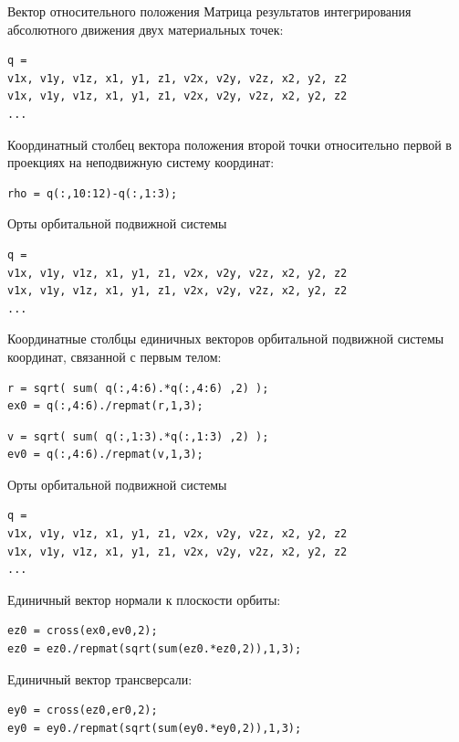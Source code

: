 \documentclass[12pt, compress]{beamer}
\begin{document}
\begin{frame}[fragile]{Вектор относительного положения}
Матрица результатов интегрирования абсолютного движения двух материальных точек:
\begin{lstlisting}
q = 
v1x, v1y, v1z, x1, y1, z1, v2x, v2y, v2z, x2, y2, z2
v1x, v1y, v1z, x1, y1, z1, v2x, v2y, v2z, x2, y2, z2
...
\end{lstlisting}
Координатный столбец вектора положения второй точки относительно первой в проекциях на неподвижную систему координат:
\begin{lstlisting}
rho = q(:,10:12)-q(:,1:3);
\end{lstlisting}
\end{frame}

\begin{frame}[fragile]{Орты орбитальной подвижной системы}
\begin{lstlisting}
q = 
v1x, v1y, v1z, x1, y1, z1, v2x, v2y, v2z, x2, y2, z2
v1x, v1y, v1z, x1, y1, z1, v2x, v2y, v2z, x2, y2, z2
...
\end{lstlisting}
Координатные столбцы единичных векторов орбитальной подвижной системы координат, связанной с первым телом:
\begin{lstlisting}
r = sqrt( sum( q(:,4:6).*q(:,4:6) ,2) );
ex0 = q(:,4:6)./repmat(r,1,3);
\end{lstlisting}
\begin{lstlisting}[firstnumber=last]
v = sqrt( sum( q(:,1:3).*q(:,1:3) ,2) );
ev0 = q(:,4:6)./repmat(v,1,3);
\end{lstlisting}
\end{frame}

\begin{frame}[fragile]{Орты орбитальной подвижной системы}
\begin{lstlisting}
q = 
v1x, v1y, v1z, x1, y1, z1, v2x, v2y, v2z, x2, y2, z2
v1x, v1y, v1z, x1, y1, z1, v2x, v2y, v2z, x2, y2, z2
...
\end{lstlisting}
Единичный вектор нормали к плоскости орбиты:
\begin{lstlisting}
ez0 = cross(ex0,ev0,2);
ez0 = ez0./repmat(sqrt(sum(ez0.*ez0,2)),1,3);
\end{lstlisting}
Единичный вектор трансверсали:
\begin{lstlisting}[firstnumber=last]
ey0 = cross(ez0,er0,2);
ey0 = ey0./repmat(sqrt(sum(ey0.*ey0,2)),1,3);
\end{lstlisting}
\end{frame}
\end{document}
